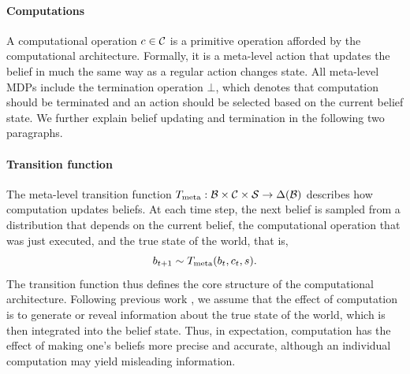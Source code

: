 \paragraph{Computations}
A computational operation $c \in \mathcal{C}$ is a primitive operation afforded by the computational architecture. Formally, it is a meta-level action that updates the belief in much the same way as a regular action changes state. All meta-level MDPs include the termination operation $\bot$, which denotes that computation should be terminated and an action should be selected based on the current belief state. We further explain belief updating and termination in the following two paragraphs.

\paragraph{Transition function}
The meta-level transition function $T_{\text{meta}}: \mathcal{B} \times \mathcal{C} \times \mathcal{S} \rightarrow \Delta(\mathcal{B})$ describes how computation updates beliefs. At each time step, the next belief is sampled from a distribution that depends on the current belief, the computational operation that was just executed, and the true state of the world, that is,
\begin{equation}
b_{t+1} \sim T_{\text{meta}}(b_t, c_t, s).
\end{equation}
The transition function thus defines the core structure of the computational architecture. Following previous work \citep{matheson1968economic,hay2012selecting}, we assume that the effect of computation is to generate or reveal information about the true state of the world, which is then integrated into the belief state. Thus, in expectation, computation has the effect of making one's beliefs more precise and accurate, although an individual computation may yield misleading information. 



